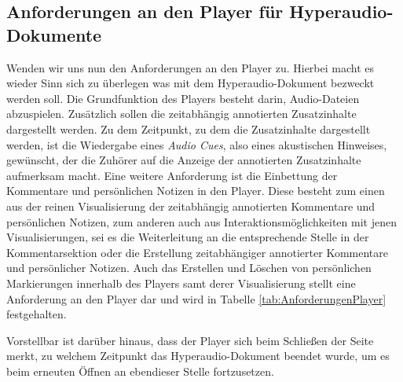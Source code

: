 \subsection{Anforderungen an den Player für Hyperaudio-Dokumente}
Wenden wir uns nun den Anforderungen an den Player zu. Hierbei macht es wieder Sinn sich zu überlegen was mit dem Hyperaudio-Dokument bezweckt werden soll. Die Grundfunktion des Players besteht darin, Audio-Dateien abzuspielen. Zusätzlich sollen die zeitabhängig annotierten Zusatzinhalte dargestellt werden. Zu dem Zeitpunkt, zu dem die Zusatzinhalte dargestellt werden, ist die Wiedergabe eines \textit{Audio Cues}, also eines akustischen Hinweises, gewünscht, der die Zuhörer auf die Anzeige der annotierten Zusatzinhalte aufmerksam macht. Eine weitere Anforderung ist die Einbettung der Kommentare und persönlichen Notizen in den Player. Diese besteht zum einen aus der reinen Visualisierung der zeitabhängig annotierten Kommentare und persönlichen Notizen, zum anderen auch aus Interaktionsmöglichkeiten mit jenen Visualisierungen, sei es die Weiterleitung an die entsprechende Stelle in der Kommentarsektion oder die Erstellung zeitabhängiger annotierter Kommentare und persönlicher Notizen. Auch das Erstellen und Löschen von persönlichen Markierungen innerhalb des Players samt derer Visualisierung stellt eine Anforderung an den Player dar und wird in Tabelle \ref{tab:AnforderungenPlayer} festgehalten.

Vorstellbar ist darüber hinaus, dass der Player sich beim Schließen der Seite merkt, zu welchem Zeitpunkt das Hyperaudio-Dokument beendet wurde, um es beim erneuten Öffnen an ebendieser Stelle fortzusetzen.


